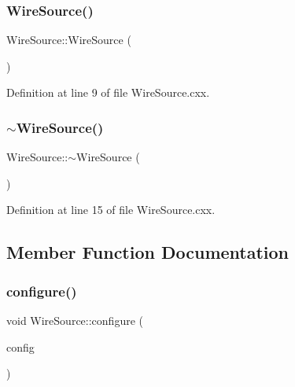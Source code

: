 \subsubsection{\texorpdfstring{Wire\+Source()}{WireSource()}}
{\footnotesize\ttfamily Wire\+Source\+::\+Wire\+Source (\begin{DoxyParamCaption}{ }\end{DoxyParamCaption})}



Definition at line 9 of file Wire\+Source.\+cxx.

\mbox{\label{class_wire_cell_1_1_wire_source_a4421c4beeeeb8bf1e1d2b9f2832a22ed}} 
\subsubsection{\texorpdfstring{$\sim$\+Wire\+Source()}{~WireSource()}}
{\footnotesize\ttfamily Wire\+Source\+::$\sim$\+Wire\+Source (\begin{DoxyParamCaption}{ }\end{DoxyParamCaption})\hspace{0.3cm}{\ttfamily [virtual]}}



Definition at line 15 of file Wire\+Source.\+cxx.



\subsection{Member Function Documentation}
\mbox{\label{class_wire_cell_1_1_wire_source_a7038c5f4c7c80fbfaaa1ad3581eaa088}} 
\subsubsection{\texorpdfstring{configure()}{configure()}}
{\footnotesize\ttfamily void Wire\+Source\+::configure (\begin{DoxyParamCaption}\item[{const \hyperlink{namespace_wire_cell_a9f705541fc1d46c608b3d32c182333ee}{Wire\+Cell\+::\+Configuration} \&}]{config }\end{DoxyParamCaption})\hspace{0.3cm}{\ttfamily [virtual]}}

